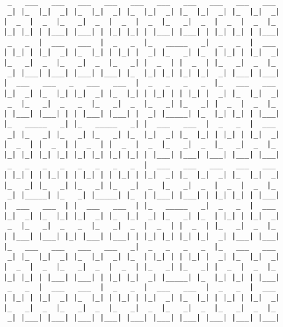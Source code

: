 \documentclass{article}
\begin{document}
\vfill
\centering
\fontsize{3pt}{2.75pt}
\begin{BVerbatim}
 _   ___   ___   ___   ___   ___   ___   ___   ___   ___   ___
 _| |_  |_|  _| |_  |_|  _| |_  |_|  _| |_  |_|  _| |_  |_|  _|
|  _  |  _  |_   _|  _  |  _  |  _  |_   _|  _  |  _  |  _  |_
|_| |_| | |___| |___| | |_| |_| | |___| |___| | |_| |_| | |___|
 _   _  |  ___   ___  |  _   _  |_   _____   _|  _   _  |  ___
| |_| | |_|  _| |_  |_| | |_| |  _| |_   _| |_  | |_| | |_|  _|
|_   _|  _  |_   _|  _  |_   _| |  _  | |  _  | |_   _|  _  |_
 _| |___| |___| |___| |___| |_  |_| |_| |_| |_|  _| |___| |___|
|  ___   ___   _   ___   ___  |  _   _   _   _  |_   ___   ___
|_|  _| |_  |_| |_|  _| |_  |_| | |_| | | |_| |  _| |_  |_|  _|
 _  |_   _|  _   _  |_   _|  _  |_   _| |_   _| |  _  |  _  |_
| |___| |___| | | |___| |___| |  _| |_____| |_  |_| |_| | |___|
|_   _____   _| |_   _____   _| |  ___   ___  |  _   _  |  ___
 _| |_   _| |_   _| |_   _| |_  |_|  _| |_  |_| | |_| | |_|  _|
|  _  | |  _  | |  _  | |  _  |  _  |_   _|  _  |_   _|  _  |_
|_| |_| |_| |_| |_| |_| |_| |_| | |___| |___| |___| |___| |___|
 _   _   _   _   _   _   _   _  |  ___   ___   ___   ___   ___
| |_| | | |_| | | |_| | | |_| | |_|  _| |_  |_|  _| |_  |_|  _|
|_   _| |_   _| |_   _| |_   _|  _  |_   _|  _  |  _  |  _  |_
 _| |_____| |_   _| |_____| |_  | |___| |___| | |_| |_| | |___|
|  ___   ___  | |  ___   ___  | |_   _____   _|  _   _  |  ___
|_|  _| |_  |_| |_|  _| |_  |_|  _| |_   _| |_  | |_| | |_|  _|
 _  |_   _|  _   _  |_   _|  _  |  _  | |  _  | |_   _|  _  |_
| |___| |___| |_| |___| |___| | |_| |_| |_| |_|  _| |___| |___|
|_   ___   ___   ___   ___   _|  _   _   _   _  |_   ___   ___
 _| |_  |_|  _| |_  |_|  _| |_  | |_| | | |_| |  _| |_  |_|  _|
|  _  |  _  |_   _|  _  |  _  | |_   _| |_   _| |  _  |  _  |_
|_| |_| | |___| |___| | |_| |_|  _| |_____| |_  |_| |_| | |___|
 _   _  |  ___   ___  |  _   _  |  ___   ___  |  _   _  |  ___
| |_| | |_|  _| |_  |_| | |_| | |_|  _| |_  |_| | |_| | |_|  _|
|_   _|  _  |_   _|  _  |_   _|  _  |_   _|  _  |_   _|  _  |_
 _| |___| |___| |___| |___| |___| |___| |___| |___| |___| |___|
\end{BVerbatim}
\end{document}
